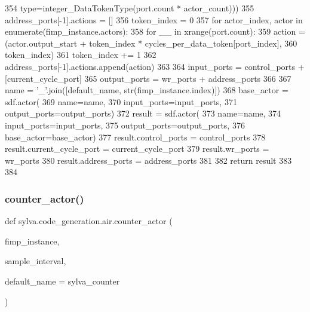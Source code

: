 \begin{DoxyCode}
354                          type=integer\_DataTokenType(port.count * actor\_count)))
355             address\_ports[-1].actions = []
356             token\_index = 0
357             \textcolor{keywordflow}{for} actor\_index, actor \textcolor{keywordflow}{in} enumerate(fimp\_instance.actors):
358                 \textcolor{keywordflow}{for} \_\_ \textcolor{keywordflow}{in} xrange(port.count):
359                     action = (actor.output\_start + token\_index * cycles\_per\_data\_token[port\_index],
360                               token\_index)
361                     token\_index += 1
362                     address\_ports[-1].actions.append(action)
363 
364     input\_ports = control\_ports + [current\_cycle\_port]
365     output\_ports = wr\_ports + address\_ports
366 
367     name = \textcolor{stringliteral}{'\_'}.join([default\_name, str(fimp\_instance.index)])
368     base\_actor = sdf.actor(
369         name=name,
370         input\_ports=input\_ports,
371         output\_ports=output\_ports)
372     result = sdf.actor(
373         name=name,
374         input\_ports=input\_ports,
375         output\_ports=output\_ports,
376         base\_actor=base\_actor)
377     result.control\_ports = control\_ports
378     result.current\_cycle\_port = current\_cycle\_port
379     result.wr\_ports = wr\_ports
380     result.address\_ports = address\_ports
381 
382     \textcolor{keywordflow}{return} result
383 
384 
\end{DoxyCode}
\mbox{\label{namespacesylva_1_1code__generation_1_1air_a50394584613c57985bc89c8fa14a058f}} 
\subsubsection{\texorpdfstring{counter\+\_\+actor()}{counter\_actor()}}
{\footnotesize\ttfamily def sylva.\+code\+\_\+generation.\+air.\+counter\+\_\+actor (\begin{DoxyParamCaption}\item[{}]{fimp\+\_\+instance,  }\item[{}]{sample\+\_\+interval,  }\item[{}]{default\+\_\+name = {\ttfamily \textquotesingle{}sylva\+\_\+counter\textquotesingle{}} }\end{DoxyParamCaption})}



